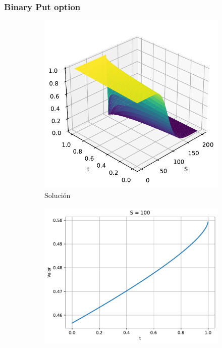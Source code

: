 \subsubsection{Binary Put option}
\begin{figure}[H]
    \centering
    \begin{subfigure}[b]{0.3\linewidth}
        \includegraphics[width=\linewidth]{Imagenes/Parte1/6_Sols/Binary_Put/BinaryPut3D.pdf}
        \caption{Solución}
    \end{subfigure}
    \begin{subfigure}[b]{0.3\linewidth}
        \includegraphics[width=\linewidth]{Imagenes/Parte1/6_Sols/Binary_Put/BinaryPutSFijo.pdf}

\end{subfigure}
\end{figure}

